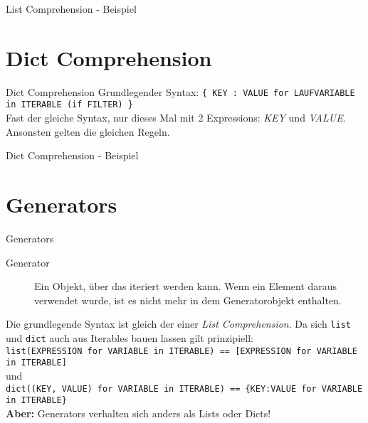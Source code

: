 \begin{frame}{List Comprehension - Beispiel}
	
\end{frame}



\section{Dict Comprehension}
\begin{frame}{Dict Comprehension}
  Grundlegender Syntax: \alert{\texttt{\{ KEY : VALUE for LAUFVARIABLE in ITERABLE (if FILTER) \}}}\\[.75cm]
  Fast der gleiche Syntax, nur dieses Mal mit 2 Expressions: \textit{KEY} und \textit{VALUE}. Ansonsten gelten die gleichen Regeln.
\end{frame}

\begin{frame}{Dict Comprehension - Beispiel}
	
\end{frame}



\section{Generators}
\begin{frame}{Generators}
	\begin{description}
		\item[Generator] Ein Objekt, \"uber das iteriert werden kann. Wenn ein Element daraus verwendet wurde, ist es nicht mehr in dem Generatorobjekt enthalten.\\[.5cm]
	\end{description}
	
	Die grundlegende Syntax ist gleich der einer \textit{List Comprehension}.
	Da sich \alert{\texttt{list}} und \alert{\texttt{dict}} auch aus Iterables bauen lassen gilt prinzipiell:\\[.25cm]

		\alert{\texttt{list(EXPRESSION for VARIABLE in ITERABLE) == [EXPRESSION for VARIABLE in ITERABLE]}}\\[.25cm]
		und\\[.25cm]
		\alert{\texttt{dict((KEY, VALUE) for VARIABLE in ITERABLE) == \{KEY:VALUE for VARIABLE in ITERABLE\}}}\\[.25cm]

	\textbf{Aber:} Generators verhalten sich anders als Lists oder Dicts!

\end{frame}





